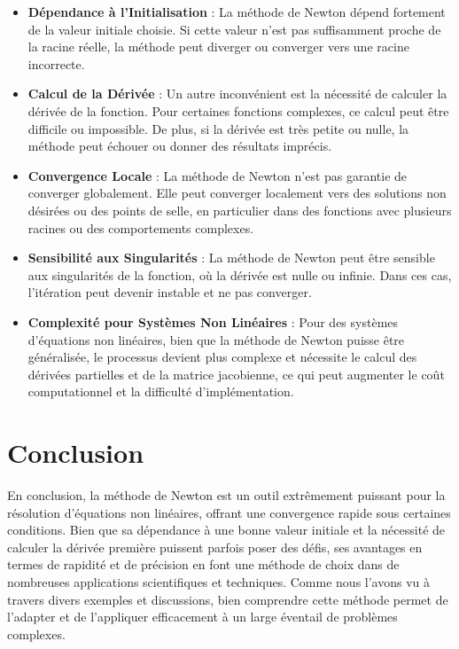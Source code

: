 \documentclass{article}
\begin{document}
\begin{itemize}
    \item \textbf{Dépendance à l'Initialisation} : La méthode de Newton dépend fortement de la valeur initiale choisie. Si cette valeur n'est pas suffisamment proche de la racine réelle, la méthode peut diverger ou converger vers une racine incorrecte.
    \item \textbf{Calcul de la Dérivée} : Un autre inconvénient est la nécessité de calculer la dérivée de la fonction. Pour certaines fonctions complexes, ce calcul peut être difficile ou impossible. De plus, si la dérivée est très petite ou nulle, la méthode peut échouer ou donner des résultats imprécis.
    \item \textbf{Convergence Locale} : La méthode de Newton n'est pas garantie de converger globalement. Elle peut converger localement vers des solutions non désirées ou des points de selle, en particulier dans des fonctions avec plusieurs racines ou des comportements complexes.
    \item \textbf{Sensibilité aux Singularités} : La méthode de Newton peut être sensible aux singularités de la fonction, où la dérivée est nulle ou infinie. Dans ces cas, l'itération peut devenir instable et ne pas converger.
    \item \textbf{Complexité pour Systèmes Non Linéaires} : Pour des systèmes d'équations non linéaires, bien que la méthode de Newton puisse être généralisée, le processus devient plus complexe et nécessite le calcul des dérivées partielles et de la matrice jacobienne, ce qui peut augmenter le coût computationnel et la difficulté d'implémentation.
\end{itemize}
\newpage

\section*{Conclusion}
En conclusion, la méthode de Newton est un outil extrêmement puissant pour la résolution d'équations non linéaires, offrant une convergence rapide sous certaines conditions. Bien que sa dépendance à une bonne valeur initiale et la nécessité de calculer la dérivée première puissent parfois poser des défis, ses avantages en termes de rapidité et de précision en font une méthode de choix dans de nombreuses applications scientifiques et techniques. Comme nous l'avons vu à travers divers exemples et discussions, bien comprendre cette méthode permet de l'adapter et de l'appliquer efficacement à un large éventail de problèmes complexes.
\end{document}
